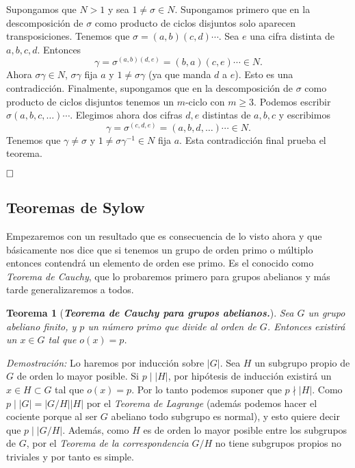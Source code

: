 \documentclass[12pt]{article}
\newtheorem{theorem}{Teorema}[section]
\begin{document}
Supongamos que $N > 1$ y sea $1 \neq \sigma \in N$. Supongamos primero que en la descomposición de $\sigma$ como producto de ciclos disjuntos solo aparecen transposiciones. Tenemos que $\sigma = (a,b)(c,d) \cdots$. Sea $e$ una cifra distinta de $a,b,c,d$. Entonces $$\gamma = \sigma^{(a,b)(d,e)}=(b,a)(c,e) \cdots \in N.$$
Ahora $\sigma \gamma \in N$, $\sigma \gamma$ fija $a$ y $1 \neq \sigma \gamma$ (ya que manda $d$ a $e$). Esto es una contradicción. Finalmente, supongamos que en la descomposición de $\sigma$ como producto de ciclos disjuntos tenemos un $m$-ciclo con $m \geq 3$. Podemos escribir $\sigma (a,b,c, \ldots) \cdots$. Elegimos ahora dos cifras $d,e$ distintas de $a,b,c$ y escribimos $$\gamma = \sigma^{(c,d,e)} = (a,b,d, \ldots) \cdots \in N.$$ Tenemos que $\gamma \neq \sigma$ y $1 \neq \sigma \gamma^{-1} \in N$ fija $a$. Esta contradicción final prueba el teorema.

$\hfill \square$

\subsection{Teoremas de Sylow}

Empezaremos con un resultado que es consecuencia de lo visto ahora y que básicamente nos dice que si tenemos un grupo de orden primo o múltiplo entonces contendrá un elemento de orden ese primo. Es el conocido como \textit{Teorema de Cauchy}, que lo probaremos primero para grupos abelianos y más tarde generalizaremos a todos.

\begin{theorem}[\textit{\textbf{Teorema de Cauchy para grupos abelianos.}}]
Sea $G$ un grupo abeliano finito, y $p$ un número primo que divide al orden de $G$. Entonces existirá un $x \in G$ tal que $o(x) = p$.
\end{theorem}
\emph{Demostración: } Lo haremos por inducción sobre $|G|$. Sea $H$ un subgrupo propio de $G$ de orden lo mayor posible. Si $p \mid |H|$, por hipótesis de inducción existirá un $x \in H \subset G$ tal que $o(x) = p$. Por lo tanto podemos suponer que $ p \nmid |H|$. Como $p \mid |G| = |G/H| |H|$ por el \textit{Teorema de Lagrange} (además podemos hacer el cociente porque al ser $G$ abeliano todo subgrupo es normal), y esto quiere decir que $p \mid |G/H|$. Además, como $H$ es de orden lo mayor posible entre los subgrupos de $G$, por el \textit{Teorema de la correspondencia} $G/H$ no tiene subgrupos propios no triviales y por tanto es simple.
\end{document}
